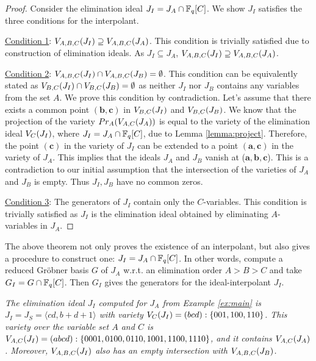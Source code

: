 \begin{proof}
Consider the elimination ideal $J_I = J_A \cap {\mathbb{F}}_{q}[C]$. We show $J_I$ satisfies 
the three conditions for the interpolant. 

\par \noindent  \underline{Condition 1}: ${V_{A,B,C}}(J_I) \supseteq
{V_{A,B,C}}(J_A)$. This condition is trivially satisfied due  to
construction of elimination ideals. As $J_I \subseteq J_A$,
${V_{A,B,C}}(J_I) \supseteq {V_{A,B,C}}(J_A)$.


\par \noindent \underline{Condition 2}: ${V_{A,B,C}}(J_I) \cap {V_{A,B,C}}(J_B) =
\emptyset$. This condition  can be equivalently stated as ${V_{B,C}}(J_I)
\cap {V_{B,C}}(J_B) = \emptyset$ as neither  $J_I$ nor $J_B$ contains any
variables from the set $A$. We prove this condition by
contradiction. Let's assume that there exists a
common point $(\mathbf{b},\mathbf{c})$ in ${V_{B,C}}(J_I)$ and ${V_{B,C}}(J_B)$.  
We know that the projection of the variety $Pr_A({V_{A,C}}(J_A))$ is equal
to the variety of the elimination ideal ${V_C}(J_I)$, where $J_I=J_A
\cap {\mathbb{F}}_{q}[C]$, due to Lemma \ref{lemma:project}. 
Therefore, the point $(\mathbf{c})$ in the variety of $J_I$ can be
extended to a point $(\mathbf{a},\mathbf{c})$ in the variety of
$J_A$. This implies that the ideals $J_A$ and $J_B$ vanish at 
($\mathbf{a},\mathbf{b},\mathbf{c}$). This is a contradiction to our
initial assumption that the intersection of the varieties of $J_A$ and
$J_B$ is empty.  Thus $J_I, J_B$ have no common zeros.

\par \noindent \underline{Condition 3}: The generators of $J_I$
contain only the $C$-variables. This condition is trivially satisfied
as $J_I$ is the elimination ideal obtained by  eliminating
$A$-variables in $J_A$. 
\end{proof}

The above theorem not only proves the existence of an interpolant, but
also gives a procedure to construct one: $J_I = J_A\cap{\mathbb{F}}_{q}[C]$. In
other words, compute a reduced Gr\"obner basis $G$ of $J_A$ w.r.t. an
elimination order $A> B > C$ and take $G_I = G \cap {\mathbb{F}}_{q}[C]$. Then
$G_I$ gives the generators for the ideal-interpolant $J_I$.

\begin{Example}
{\it 
The elimination ideal $J_I$ computed for $J_A$ from Example \ref{ex:main}
is $J_I = J_S = \langle cd,b+d+1 \rangle$ with variety
${V_C}(J_I)=(bcd):\{001,100,110\}$.  This variety over the variable set
$A$ and $C$ is ${V_{A,C}}(J_I)=(abcd):\{0001,0100,0110, 1001,1100,1110\}$,
and it contains ${V_{A,C}}(J_A)$. Moreover, ${V_{A,B,C}}(J_I)$ also has an empty
intersection with ${V_{A,B,C}}(J_B)$. 
}
\end{Example}

